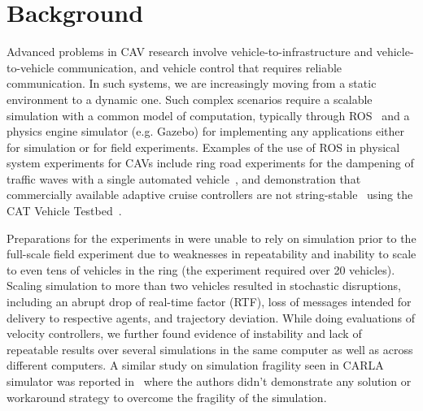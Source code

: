 \documentclass[aps,pra,twocolumn,notitlepage,nofootinbib,superscriptaddress]{revtex4-1}
\begin{document}
\section{Background}
\label{sec:background}
Advanced problems in CAV research involve vehicle-to-infrastructure and vehicle-to-vehicle communication, and vehicle control that requires reliable communication. In such systems, we are increasingly moving from a static environment to a dynamic one. Such complex scenarios require a scalable simulation with a common model of computation, typically through ROS~\cite{quigley2009ros} and a physics engine simulator (e.g. Gazebo) for implementing any applications either for simulation or for field experiments. 
Examples of the use of ROS in physical system experiments for CAVs include ring road experiments for the dampening of traffic waves with a single automated vehicle~\cite{stern2017dissipation, bhadani2018dissipation, delle2019feedback}, and demonstration that commercially available adaptive cruise controllers are not string-stable~\cite{459} using the CAT Vehicle Testbed~\cite{bhadani2018cat}.

Preparations for the experiments in \cite{stern2017dissipation} were unable to rely on simulation prior to the full-scale field experiment due to weaknesses in repeatability and inability to scale to even tens of vehicles in the ring (the experiment required over 20 vehicles). 
Scaling simulation to more than two vehicles resulted in stochastic disruptions, including an abrupt drop of real-time factor (RTF), loss of messages intended for delivery to respective agents, and trajectory deviation. While doing evaluations of velocity controllers, we further found evidence of instability and lack of repeatable results over several simulations in the same computer as well as across different computers.  A similar study on simulation fragility seen in CARLA simulator was reported in~\cite{chance2021determinism} where the authors didn't demonstrate any solution or workaround strategy to overcome the fragility of the simulation.
\end{document}
